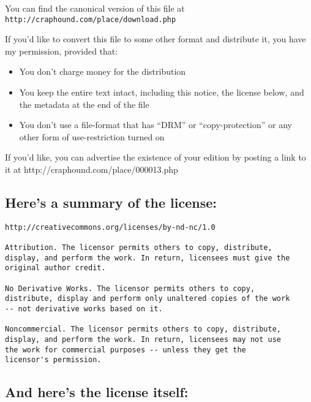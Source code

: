 You can find the canonical version of this file at\\
\texttt{http://craphound.com/place/download.php}

If you'd like to convert this file to some other format and
distribute it, you have my permission, provided that:

\begin{itemize}
\item
  You don't charge money for the distribution

\item
  You keep the entire text intact, including this notice, the license
  below, and the metadata at the end of the file

\item
  You don't use a file-format that has ``DRM'' or ``copy-protection''
  or any other form of use-restriction turned on

\end{itemize}
If you'd like, you can advertise the existence of your edition by
posting a link to it at http://craphound.com/place/000013.php

\subsection{Here's a summary of the license:}

\begin{verbatim}
http://creativecommons.org/licenses/by-nd-nc/1.0

Attribution. The licensor permits others to copy, distribute,
display, and perform the work. In return, licensees must give the
original author credit.

No Derivative Works. The licensor permits others to copy,
distribute, display and perform only unaltered copies of the work
-- not derivative works based on it.

Noncommercial. The licensor permits others to copy, distribute,
display, and perform the work. In return, licensees may not use
the work for commercial purposes -- unless they get the
licensor's permission.
\end{verbatim}

\subsection{And here's the license itself:}


